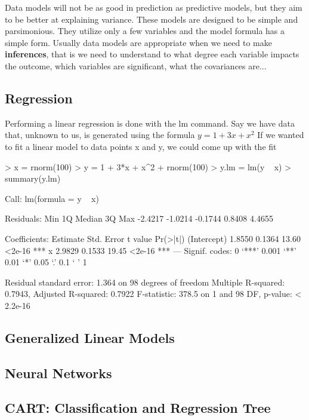 \documentclass{article}
\begin{document}
Data models will not be as good in prediction as predictive models, but they
aim to be better at explaining variance.  These models are designed to be simple
and parsimonious.  They utilize only a few variables and the model formula
has a simple form.  Usually data models are appropriate when we need to make
\textbf{inferences}, that is we need to understand to what degree each variable
impacts the outcome, which variables are significant, what the covariances are...

\subsection{Regression}

Performing a linear regression is done with the lm command.  Say we have
data that, unknown to us, is generated using the formula $y = 1 + 3x + x^2$
If we wanted to fit a linear model to data points x and y, we could come
up with the fit

\begin{Schunk}
\begin{Sinput}
> x = rnorm(100)
> y = 1 + 3*x + x^2 + rnorm(100)
> y.lm = lm(y ~ x)
> summary(y.lm)
\end{Sinput}
\begin{Soutput}
Call:
lm(formula = y ~ x)

Residuals:
    Min      1Q  Median      3Q     Max 
-2.4217 -1.0214 -0.1744  0.8408  4.4655 

Coefficients:
            Estimate Std. Error t value Pr(>|t|)    
(Intercept)   1.8550     0.1364   13.60   <2e-16 ***
x             2.9829     0.1533   19.45   <2e-16 ***
---
Signif. codes:  0 ‘***’ 0.001 ‘**’ 0.01 ‘*’ 0.05 ‘.’ 0.1 ‘ ’ 1 

Residual standard error: 1.364 on 98 degrees of freedom
Multiple R-squared: 0.7943,	Adjusted R-squared: 0.7922 
F-statistic: 378.5 on 1 and 98 DF,  p-value: < 2.2e-16 
\end{Soutput}
\end{Schunk}

\subsection{Generalized Linear Models}

\subsection{Neural Networks}

\subsection{CART: Classification and Regression Tree}
\end{document}
